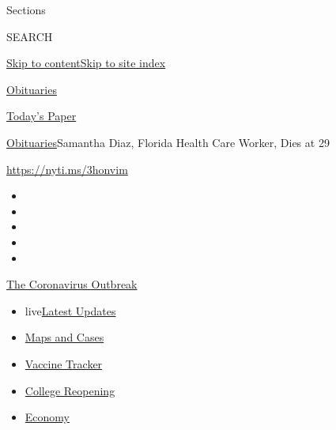 Sections

SEARCH

\protect\hyperlink{site-content}{Skip to
content}\protect\hyperlink{site-index}{Skip to site index}

\href{https://www.nytimes3xbfgragh.onion/section/obituaries}{Obituaries}

\href{https://myaccount.nytimes3xbfgragh.onion/auth/login?response_type=cookie\&client_id=vi}{}

\href{https://www.nytimes3xbfgragh.onion/section/todayspaper}{Today's
Paper}

\href{/section/obituaries}{Obituaries}\textbar{}Samantha Diaz, Florida
Health Care Worker, Dies at 29

\url{https://nyti.ms/3honvim}

\begin{itemize}
\item
\item
\item
\item
\item
\end{itemize}

\href{https://www.nytimes3xbfgragh.onion/news-event/coronavirus?action=click\&pgtype=Article\&state=default\&region=TOP_BANNER\&context=storylines_menu}{The
Coronavirus Outbreak}

\begin{itemize}
\tightlist
\item
  live\href{https://www.nytimes3xbfgragh.onion/2020/08/04/world/coronavirus-covid-19.html?action=click\&pgtype=Article\&state=default\&region=TOP_BANNER\&context=storylines_menu}{Latest
  Updates}
\item
  \href{https://www.nytimes3xbfgragh.onion/interactive/2020/us/coronavirus-us-cases.html?action=click\&pgtype=Article\&state=default\&region=TOP_BANNER\&context=storylines_menu}{Maps
  and Cases}
\item
  \href{https://www.nytimes3xbfgragh.onion/interactive/2020/science/coronavirus-vaccine-tracker.html?action=click\&pgtype=Article\&state=default\&region=TOP_BANNER\&context=storylines_menu}{Vaccine
  Tracker}
\item
  \href{https://www.nytimes3xbfgragh.onion/2020/08/02/us/covid-college-reopening.html?action=click\&pgtype=Article\&state=default\&region=TOP_BANNER\&context=storylines_menu}{College
  Reopening}
\item
  \href{https://www.nytimes3xbfgragh.onion/live/2020/08/03/business/stock-market-today-coronavirus?action=click\&pgtype=Article\&state=default\&region=TOP_BANNER\&context=storylines_menu}{Economy}
\end{itemize}

